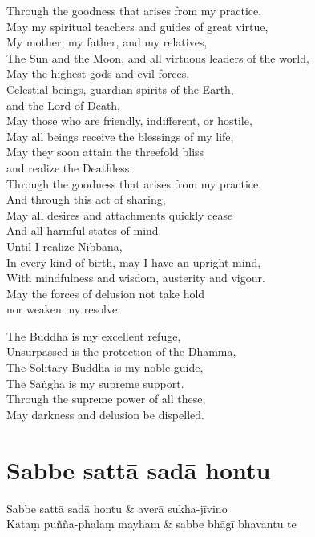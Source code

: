 Through the goodness that arises from my practice,\\
May my spiritual teachers and guides of great virtue,\\
My mother, my father, and my relatives,\\
The Sun and the Moon, and all virtuous leaders of the world,\\
May the highest gods and evil forces,\\
Celestial beings, guardian spirits of the Earth,\\\vin and the Lord of Death,\\
May those who are friendly, indifferent, or hostile,\\
May all beings receive the blessings of my life,\\
May they soon attain the threefold bliss\\\vin and realize the Deathless.\\
Through the goodness that arises from my practice,\\
And through this act of sharing,\\
May all desires and attachments quickly cease\\
And all harmful states of mind.\\
Until I realize Nibbāna,\\
In every kind of birth, may I have an upright mind,\\
With mindfulness and wisdom, austerity and vigour.\\
May the forces of delusion not take hold\\\vin nor weaken my resolve.

The Buddha is my excellent refuge,\\
Unsurpassed is the protection of the Dhamma,\\
The Solitary Buddha is my noble guide,\\
The Saṅgha is my supreme support.\\
Through the supreme power of all these,\\
May darkness and delusion be dispelled.

\section{Sabbe sattā sadā hontu}


\begin{twochants}
Sabbe sattā sadā hontu & averā sukha-jīvino\\
Kataṃ puñña-phalaṃ mayhaṃ & sabbe bhāgī bhavantu te
\end{twochants}

